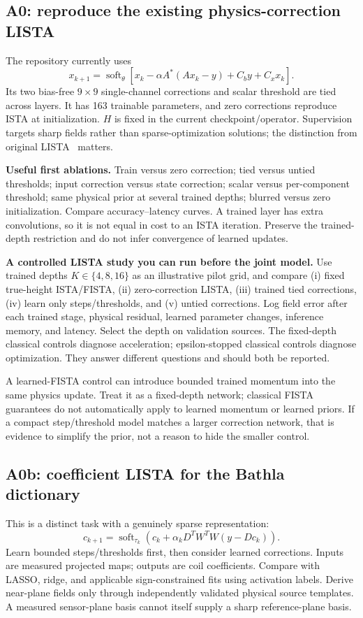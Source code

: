 \subsection{A0: reproduce the existing physics-correction LISTA}
The repository currently uses
\begin{equation}
 x_{k+1}=\operatorname{soft}_{\theta}\left[x_k-\alpha A^*(Ax_k-y)+C_b y+C_x x_k\right].
\end{equation}
Its two bias-free $9\times9$ single-channel corrections and scalar threshold are tied across layers. It has 163 trainable parameters, and zero corrections reproduce ISTA at initialization. $H$ is fixed in the current checkpoint/operator. Supervision targets sharp fields rather than sparse-optimization solutions; the distinction from original LISTA~\cite{lista} matters.

\textbf{Useful first ablations.} Train versus zero correction; tied versus untied thresholds; input correction versus state correction; scalar versus per-component threshold; same physical prior at several trained depths; blurred versus zero initialization. Compare accuracy--latency curves. A trained layer has extra convolutions, so it is not equal in cost to an ISTA iteration. Preserve the trained-depth restriction and do not infer convergence of learned updates.

\textbf{A controlled LISTA study you can run before the joint model.} Use trained depths $K\in\{4,8,16\}$ as an illustrative pilot grid, and compare (i) fixed true-height ISTA/FISTA, (ii) zero-correction LISTA, (iii) trained tied corrections, (iv) learn only steps/thresholds, and (v) untied corrections. Log field error after each trained stage, physical residual, learned parameter changes, inference memory, and latency. Select the depth on validation sources. The fixed-depth classical controls diagnose acceleration; epsilon-stopped classical controls diagnose optimization. They answer different questions and should both be reported.

A learned-FISTA control can introduce bounded trained momentum into the same physics update. Treat it as a fixed-depth network; classical FISTA guarantees do not automatically apply to learned momentum or learned priors. If a compact step/threshold model matches a larger correction network, that is evidence to simplify the prior, not a reason to hide the smaller control.

\subsection{A0b: coefficient LISTA for the Bathla dictionary}
This is a distinct task with a genuinely sparse representation:
\begin{equation}
 c_{k+1}=\operatorname{soft}_{\tau_k}\left(c_k+\alpha_k D^TW^TW(y-Dc_k)\right).
\end{equation}
Learn bounded steps/thresholds first, then consider learned corrections. Inputs are measured projected maps; outputs are coil coefficients. Compare with LASSO, ridge, and applicable sign-constrained fits using activation labels. Derive near-plane fields only through independently validated physical source templates. A measured sensor-plane basis cannot itself supply a sharp reference-plane basis.

